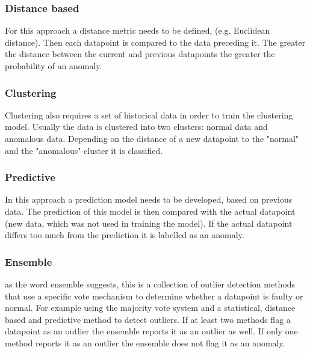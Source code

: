 \subsubsection{Distance based}
For this approach a distance metric needs to be defined, (e.g. Euclidean distance). Then each datapoint is compared to the data preceding it. The greater the distance between the current and previous datapoints the greater the probability of an anomaly. \cite{cookAnomalyDetectionIoT2020, giannoniAnomalyDetectionModels2018, chandolaAnomalyDetectionSurvey2009}

\subsubsection{Clustering}
Clustering also requires a set of historical data in order to train the clustering model. Usually the data is clustered into two clusters: normal data and anomalous data. Depending on the distance of a new datapoint to the "normal" and the "anomalous" cluster it is classified.
\cite{cookAnomalyDetectionIoT2020, giannoniAnomalyDetectionModels2018, chandolaAnomalyDetectionSurvey2009}
\subsubsection{Predictive}
In this approach a prediction model needs to be developed, based on previous data. The prediction of this model is then compared with the actual datapoint (new data, which was not used in training the model). If the actual datapoint differs too much from the prediction it is labelled as an anomaly. \cite{cookAnomalyDetectionIoT2020, giannoniAnomalyDetectionModels2018}


\subsubsection{Ensemble}
as the word ensemble suggests, this is a collection of outlier detection methods that use a specific vote mechanism to determine whether a datapoint is faulty or normal. For example using the majority vote system and a statistical, distance based and predictive method to detect outliers. If at least two methods flag a datapoint as an outlier the ensemble reports it as an outlier as well. If only one method reports it as an outlier the ensemble does not flag it as an anomaly.
\cite{cookAnomalyDetectionIoT2020}

